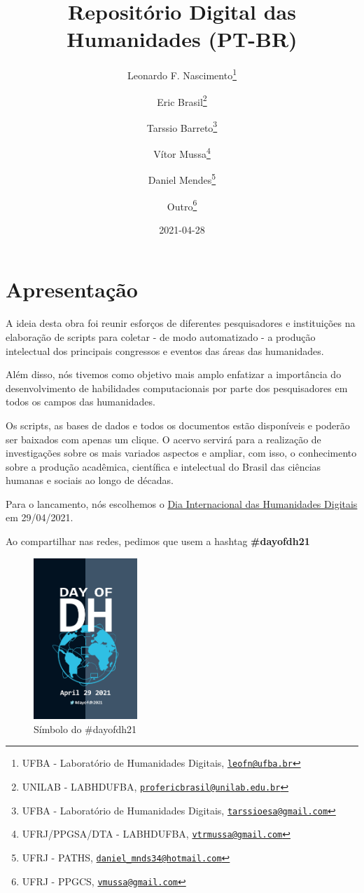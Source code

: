 \documentclass[
]{book}
\title{Repositório Digital das Humanidades (PT-BR)}
\author{Leonardo F. Nascimento\footnote{UFBA - Laboratório de Humanidades Digitais, \href{mailto:leofn@ufba.br}{\nolinkurl{leofn@ufba.br}}} \and Eric Brasil\footnote{UNILAB - LABHDUFBA, \href{mailto:profericbrasil@unilab.edu.br}{\nolinkurl{profericbrasil@unilab.edu.br}}} \and Tarssio Barreto\footnote{UFBA - Laboratório de Humanidades Digitais, \href{mailto:tarssioesa@gmail.com}{\nolinkurl{tarssioesa@gmail.com}}} \and Vítor Mussa\footnote{UFRJ/PPGSA/DTA - LABHDUFBA, \href{mailto:vtrmussa@gmail.com}{\nolinkurl{vtrmussa@gmail.com}}} \and Daniel Mendes\footnote{UFRJ - PATHS, \href{mailto:daniel_mnds34@hotmail.com}{\nolinkurl{daniel\_mnds34@hotmail.com}}} \and Outro\footnote{UFRJ - PPGCS, \href{mailto:vmussa@gmail.com}{\nolinkurl{vmussa@gmail.com}}}}
\date{2021-04-28}
\begin{document}
\maketitle

{
\setcounter{tocdepth}{1}
\tableofcontents
}
\hypertarget{apresentauxe7uxe3o}{%
\chapter{Apresentação}\label{apresentauxe7uxe3o}}

A ideia desta obra foi reunir esforços de diferentes pesquisadores e instituições na elaboração de scripts para coletar - de modo automatizado - a produção intelectual dos principais congressos e eventos das áreas das humanidades.

Além disso, nós tivemos como objetivo mais amplo enfatizar a importância do desenvolvimento de habilidades computacionais por parte dos pesquisadores em todos os campos das humanidades.

Os scripts, as bases de dados e todos os documentos estão disponíveis e poderão ser baixados com apenas um clique. O acervo servirá para a realização de investigações sobre os mais variados aspectos e ampliar, com isso, o conhecimento sobre a produção acadêmica, científica e intelectual do Brasil das ciências humanas e sociais ao longo de décadas.

Para o lancamento, nós escolhemos o \href{https://dhcenternet.org/initiatives/day-of-dh/2021}{Dia Internacional das Humanidades Digitais} em 29/04/2021.

Ao compartilhar nas redes, pedimos que usem a hashtag \textbf{\#dayofdh21}

\begin{figure}
\centering
\includegraphics[width=0.35\textwidth,height=\textheight]{./img/dayofdh.jpg}
\caption{Símbolo do \#dayofdh21}
\end{figure}
\end{document}
